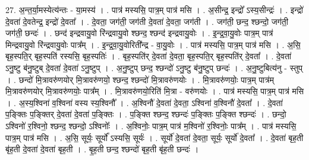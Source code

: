 \documentclass[17pt]{extarticle}
\begin{document}
27. अ॒न्त॒र्या॒मस्येत्य॑न्तः - या॒मस्य॑ । . पात्र॑ मस्यसि॒ पात्र॒म् पात्र॑ मसि । . अ॒सीन्द्र॒ इन्द्रो᳚ ऽस्य॒सीन्द्रः॑ । . इन्द्रो॑ दे॒वता॑ दे॒वतेन्द्र॒ इन्द्रो॑ दे॒वता᳚ । . दे॒वता॒ जग॑ती॒ जग॑ती दे॒वता॑ दे॒वता॒ जग॑ती । . जग॑ती॒ छन्द॒ श्छन्दो॒ जग॑ती॒ जग॑ती॒ छन्दः॑ । . छन्द॑ इन्द्रवायु॒वो रि॑न्द्रवायु॒वो श्छन्द॒ श्छन्द॑ इन्द्रवायु॒वोः । . इ॒न्द्र॒वा॒यु॒वोः पात्र॒म् पात्र॑ मिन्द्रवायु॒वो रि॑न्द्रवायु॒वोः पात्र᳚म् । . इ॒न्द्र॒वा॒यु॒वोरिती᳚न्द्र - वा॒यु॒वोः । . पात्र॑ मस्यसि॒ पात्र॒म् पात्र॑ मसि । . अ॒सि॒ बृह॒स्पति॒र् बृह॒स्पति॑ रस्यसि॒ बृह॒स्पतिः॑ । . बृह॒स्पति॑र् दे॒वता॑ दे॒वता॒ बृह॒स्पति॒र् बृह॒स्पति॑र् दे॒वता᳚ । . दे॒वता॑ ऽनु॒ष्टु ब॑नु॒ष्टुब् दे॒वता॑ दे॒वता॑ ऽनु॒ष्टुप् । . अ॒नु॒ष्टुप् छन्द॒ श्छन्दो॑ ऽनु॒ष्टु ब॑नु॒ष्टुप् छन्दः॑ । . अ॒नु॒ष्टुबित्य॑नु - स्तुप् । . छन्दो॑ मि॒त्रावरु॑णयोर् मि॒त्रावरु॑णयो॒ श्छन्द॒ श्छन्दो॑ मि॒त्रावरु॑णयोः । . मि॒त्रावरु॑णयोः॒ पात्र॒म् पात्र॑म् मि॒त्रावरु॑णयोर् मि॒त्रावरु॑णयोः॒ पात्र᳚म् । . मि॒त्रावरु॑णयो॒रिति॑ मि॒त्रा - वरु॑णयोः । . पात्र॑ मस्यसि॒ पात्र॒म् पात्र॑ मसि । . अ॒स्य॒श्विना॑ व॒श्विना॑ वस्य स्य॒श्विनौ᳚ । . अ॒श्विनौ॑ दे॒वता॑ दे॒वता॒ ऽश्विना॑ व॒श्विनौ॑ दे॒वता᳚ । . दे॒वता॑ प॒ङ्क्तिः प॒ङ्क्तिर् दे॒वता॑ दे॒वता॑ प॒ङ्क्तिः । . प॒ङ्क्ति श्छन्द॒ श्छन्दः॑ प॒ङ्क्तिः प॒ङ्क्ति श्छन्दः॑ । . छन्दो॒ ऽश्विनो॑ र॒श्विनो॒ श्छन्द॒ श्छन्दो॒ ऽश्विनोः᳚ । . अ॒श्विनोः॒ पात्र॒म् पात्र॑ म॒श्विनो॑ र॒श्विनोः॒ पात्र᳚म् । . पात्र॑ मस्यसि॒ पात्र॒म् पात्र॑ मसि । . अ॒सि॒ सूर्यः॒ सूर्यो᳚ ऽस्यसि॒ सूर्यः॑ । . सूर्यो॑ दे॒वता॑ दे॒वता॒ सूर्यः॒ सूर्यो॑ दे॒वता᳚ । . दे॒वता॑ बृह॒ती बृ॑ह॒ती दे॒वता॑ दे॒वता॑ बृह॒ती । . बृ॒ह॒ती छन्द॒ श्छन्दो॑ बृह॒ती बृ॑ह॒ती छन्दः॑ । \newline
\end{document}

